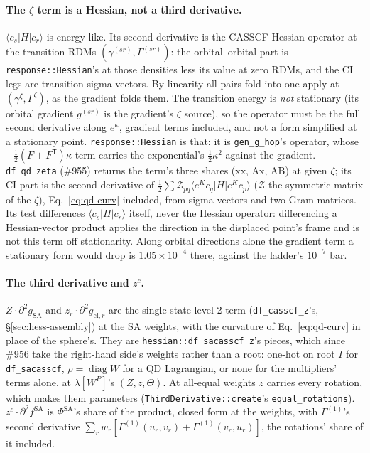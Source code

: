 \documentclass[11pt]{article}
\newcommand{\code}[1]{\texttt{#1}}
\newcommand{\G}[1]{\Gamma^{(#1)}}
\newcommand{\T}{\mathsf T}
\begin{document}
\paragraph{The $\zeta$ term is a Hessian, not a third derivative.}
$\langle c_s|H|c_r\rangle$ is energy-like. Its second derivative is the
CASSCF Hessian operator at the transition RDMs $(\gamma^{(sr)},
\Gamma^{(sr)})$: the orbital--orbital part is \code{response::Hessian}'s at
those densities less its value at zero RDMs, and the CI legs are transition
sigma vectors. By linearity all pairs fold into one apply at
$(\gamma^\zeta, \Gamma^\zeta)$, as the gradient folds them. The transition
energy is \emph{not} stationary (its orbital gradient $g^{(sr)}$ is the
gradient's $\zeta$ source), so the operator must be the full second
derivative along $e^\kappa$, gradient terms included, and not a form
simplified at a stationary point. \code{response::Hessian} is that:
it is \code{gen\_g\_hop}'s operator, whose $-\tfrac12(F + F^\T)\kappa$ term
carries the exponential's $\tfrac12\kappa^2$ against the gradient.
\code{df\_qd\_zeta} (\#955) returns the term's three shares (xx, Ax, AB) at
given $\zeta$; its CI part is the second derivative of $\tfrac12\sum
\mathcal Z_{pq}\langle e^Kc_q|H|e^Kc_p\rangle$ ($\mathcal Z$ the symmetric
matrix of the $\zeta$), Eq.~\eqref{eq:qd-curv} included, from sigma vectors
and two Gram matrices. Its test differences $\langle c_s|H|c_r\rangle$
itself, never the Hessian operator: differencing a Hessian-vector product
applies the direction in the displaced point's frame and is not this term
off stationarity. Along orbital directions alone the gradient term a
stationary form would drop is $1.05\times10^{-4}$ there, against the
ladder's $10^{-7}$ bar.

\paragraph{The third derivative and $z^c$.} $Z\cdot\partial^2g_{\mathrm{SA}}$
and $z_r\cdot\partial^2g_{\mathrm{ci},r}$ are the single-state level-2 term
(\code{df\_casscf\_z}'s, \S\ref{sec:hess-assembly}) at the SA weights, with
the curvature of Eq.~\eqref{eq:qd-curv} in place of the sphere's. They are
\code{hessian::df\_sacasscf\_z}'s pieces, which since \#956 take the
right-hand side's weights rather than a root: one-hot on root $I$ for
\code{df\_sacasscf}, $\rho = \operatorname{diag}W$ for a QD Lagrangian, or
none for the multipliers' terms alone, at $\lambda[W^P]$'s $(Z, z,
\Theta)$. At all-equal weights $z$ carries every rotation, which makes them
parameters (\code{ThirdDerivative::create}'s \code{equal\_rotations}).
$z^c\cdot\partial^2f^{\mathrm{SA}}$ is $\Phi^{\mathrm{SA}}$'s share of the
product, closed form at the weights, with $\G1$'s second derivative
$\sum_r w_r[\G1(u_r, v_r) + \G1(v_r, u_r)]$, the rotations' share of it
included.
\end{document}
